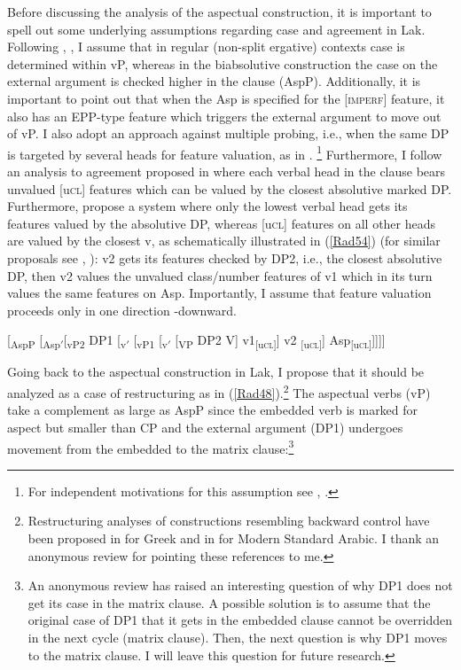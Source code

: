 \documentclass[output=paper]{langscibook}
\begin{document}
Before discussing the analysis of the aspectual construction, it is important to spell out some underlying assumptions regarding case and agreement in Lak. Following \cite{GagliardiRadkevich2014}, \citet{Radkevich2017},  I assume that in regular (non-split ergative) contexts  case is determined within vP, whereas in the biabsolutive construction the case on the external argument is checked higher in the clause (AspP). Additionally, it is important to point out that when the Asp is specified for the [\textsc{imperf}] feature, it also has an EPP-type feature which triggers the external argument to move out of vP. I also adopt an approach against multiple probing, i.e., when the same DP is targeted by several heads for feature valuation, as in \citet{PolinskyChumakina2017}. \footnote{For independent motivations for this assumption see \cite{Rezac2003}, \cite{BakerWillie2010}.} Furthermore, I follow an analysis to agreement proposed in \citet{PolinskyChumakina2017} where each verbal head in the clause bears unvalued [u\textsc{cl}] features which can be valued by the closest absolutive marked DP. Furthermore, \citet{PolinskyChumakina2017} propose a system where only the lowest verbal head gets its features valued by the absolutive DP, whereas [u\textsc{cl}] features on all other heads are valued by the closest v, as schematically illustrated in (\ref{Rad54}) (for similar proposals see \citealt{Collins2003}, \citealt{BakerWillie2010}): v2 gets its features checked by DP2, i.e., the closest absolutive DP, then v2 values the unvalued class/number features of v1 which in its turn values the same features on Asp. Importantly, I assume that feature valuation proceeds only in one direction -downward.


\ea\label{Rad54}

[\textsubscript{AspP} [\textsubscript{Asp$'$}[\textsubscript{vP2} DP1 [\textsubscript{v$'$} [\textsubscript{vP1} [\textsubscript{v$'$} [\textsubscript{VP} DP2 V]  v1\textsubscript{[u\textsc{cl}]}] v2 \textsubscript{[u\textsc{cl}]}] Asp\textsubscript{[u\textsc{cl}]}]]]]\\
\z

Going back to the aspectual construction in Lak, I propose that it should be analyzed as a case of restructuring as in (\ref{Rad48}).\footnote{Restructuring analyses of constructions resembling backward control have been proposed in \cite{Roussou2009} for Greek and in \cite{GreshlerWintner2017} for Modern Standard Arabic. I thank an anonymous review for pointing these references to me.} The aspectual verbs (vP) take a complement as large as AspP since the embedded verb is marked for aspect but smaller than CP and the external argument (DP1) undergoes movement from the embedded to the matrix clause:\footnote{An anonymous review has raised an interesting question of why DP1 does not get its case in the matrix clause. A possible solution is to assume that the original case of DP1 that it gets in the embedded clause cannot be overridden in the next cycle (matrix clause). Then, the next question is why DP1 moves to the matrix clause. I will leave this question for future research.}
\end{document}

